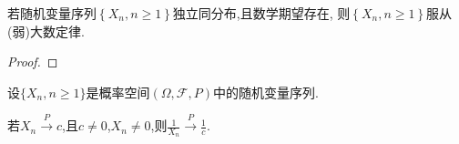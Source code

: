 \documentclass[lang=cn,newtx,10pt,sCheme=Chinese,citestyle=gb7714-2015, bibstyle=gb7714-2015]{../../Template/elegantbook}
\begin{document}
\begin{theorem}[Khinchin大数定律]\label{theorem:Khinchin大数定律}
若随机变量序列$\left\{ X_n,n\geqslant 1 \right\}$独立同分布,且数学期望存在,
则$\left\{ X_n,n\geqslant 1 \right\}$服从(弱)大数定律.
\end{theorem}
\begin{proof}



\end{proof}

\begin{theorem}[依概率收敛的性质]\label{theorem:依概率收敛的性质}
设\(\{ X_n, n \geqslant 1\}\)是概率空间\((\varOmega, \mathcal{F}, P)\)中的随机变量序列.

若\(X_n \overset{P}{\rightarrow} c\),且\(c \neq 0\),\(X_n \neq 0\),则\(\frac{1}{X_n} \overset{P}{\rightarrow} \frac{1}{c}\).
\end{theorem}
\end{document}
